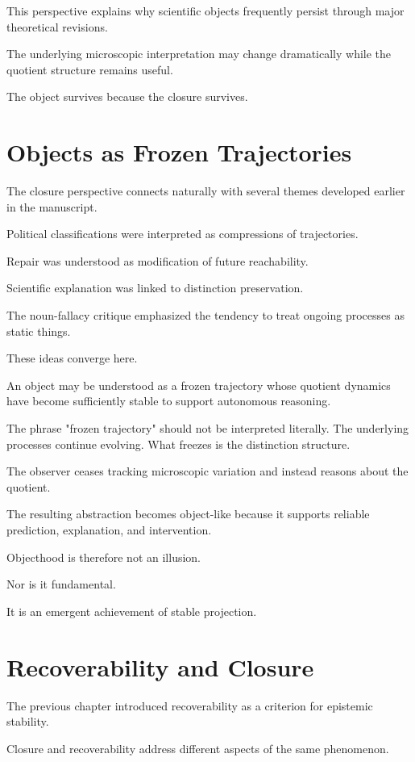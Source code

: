 \documentclass[11pt,oneside,openany]{book}
\begin{document}
This perspective explains why scientific objects frequently persist through major theoretical revisions.

The underlying microscopic interpretation may change dramatically while the quotient structure remains useful.

The object survives because the closure survives.

\section{Objects as Frozen Trajectories}

The closure perspective connects naturally with several themes developed earlier in the manuscript.

Political classifications were interpreted as compressions of trajectories.

Repair was understood as modification of future reachability.

Scientific explanation was linked to distinction preservation.

The noun-fallacy critique emphasized the tendency to treat ongoing processes as static things.

These ideas converge here.

An object may be understood as a frozen trajectory whose quotient dynamics have become sufficiently stable to support autonomous reasoning.

The phrase "frozen trajectory" should not be interpreted literally. The underlying processes continue evolving. What freezes is the distinction structure.

The observer ceases tracking microscopic variation and instead reasons about the quotient.

The resulting abstraction becomes object-like because it supports reliable prediction, explanation, and intervention.

Objecthood is therefore not an illusion.

Nor is it fundamental.

It is an emergent achievement of stable projection.

\section{Recoverability and Closure}

The previous chapter introduced recoverability as a criterion for epistemic stability.

Closure and recoverability address different aspects of the same phenomenon.
\end{document}
